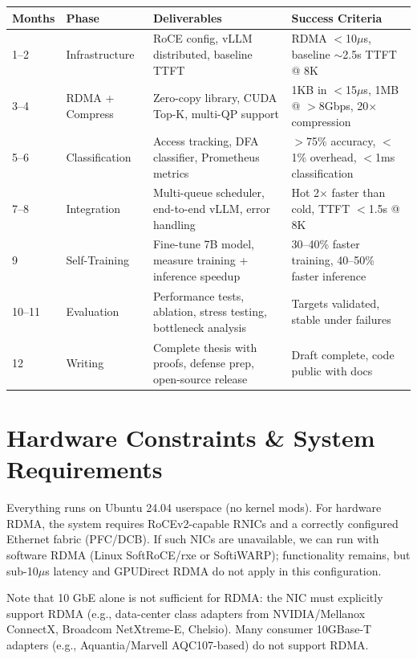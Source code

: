 \documentclass[10pt,letterpaper]{article}
\begin{document}
\begin{table}[h]
\centering
\small
\begin{tabular}{@{}p{1.5cm}p{3cm}p{5cm}p{4.5cm}@{}}
\toprule
\textbf{Months} & \textbf{Phase} & \textbf{Deliverables} & \textbf{Success Criteria} \\
\midrule
1--2 & Infrastructure & RoCE config, vLLM distributed, baseline TTFT & RDMA $<$10$\mu$s, baseline $\sim$2.5s TTFT @ 8K \\
3--4 & RDMA + Compress & Zero-copy library, CUDA Top-K, multi-QP support & 1KB in $<$15$\mu$s, 1MB @ $>$8Gbps, 20$\times$ compression \\
5--6 & Classification & Access tracking, DFA classifier, Prometheus metrics & $>$75\% accuracy, $<$1\% overhead, $<$1ms classification \\
7--8 & Integration & Multi-queue scheduler, end-to-end vLLM, error handling & Hot 2$\times$ faster than cold, TTFT $<$1.5s @ 8K \\
9 & Self-Training & Fine-tune 7B model, measure training + inference speedup & 30--40\% faster training, 40--50\% faster inference \\
10--11 & Evaluation & Performance tests, ablation, stress testing, bottleneck analysis & Targets validated, stable under failures \\
12 & Writing & Complete thesis with proofs, defense prep, open-source release & Draft complete, code public with docs \\
\bottomrule
\end{tabular}
\end{table}

\section{Hardware Constraints \& System Requirements}

Everything runs on Ubuntu 24.04 userspace (no kernel mods). For hardware RDMA, the system requires RoCEv2-capable RNICs and a correctly configured Ethernet fabric (PFC/DCB). If such NICs are unavailable, we can run with software RDMA (Linux SoftRoCE/rxe or SoftiWARP); functionality remains, but sub-10$\mu$s latency and GPUDirect RDMA do not apply in this configuration.

Note that 10 GbE alone is not sufficient for RDMA: the NIC must explicitly support RDMA (e.g., data-center class adapters from NVIDIA/Mellanox ConnectX, Broadcom NetXtreme-E, Chelsio). Many consumer 10GBase-T adapters (e.g., Aquantia/Marvell AQC107-based) do not support RDMA.
\end{document}
